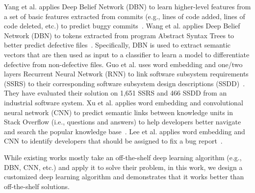 Yang et al. applies Deep Belief Network (DBN) to learn higher-level features from a set of basic features extracted from commits (e.g., lines of code added, lines of code deleted, etc.) to predict buggy commits~\cite{YangLXZS15}. Wang et al. applies Deep Belief Network (DBN) to tokens extracted from program Abstract Syntax Trees to better predict defective files~\cite{WangLT16}. Specifically, DBN is used to extract semantic vectors that are then used as input to a classifier to learn a model to differentiate defective from non-defective files. Guo et al. uses word embedding and one/two layers Recurrent Neural Network (RNN) to link software subsystem requirements (SSRS) to their corresponding software subsystem design descriptions (SSDD)~\cite{0004CC17}. They have evaluated their solution on 1,651 SSRS and 466 SSDD from an industrial software system. Xu et al. applies word embedding and convolutional neural network (CNN) to predict semantic links between knowledge units in Stack Overflow (i.e., questions and answers) to help developers better navigate and search the popular knowledge base~\cite{XuYXXCL16}. Lee et al. applies word embedding and CNN to identify developers that should be assigned to fix a bug report~\cite{LeeHLKJ17}.

While existing works mostly take an off-the-shelf deep learning algorithm (e.g., DBN, CNN, etc.) and apply it to solve their problem, in this work, we design a customized deep learning algorithm and demonstrates that it works better than off-the-shelf solutions. 


